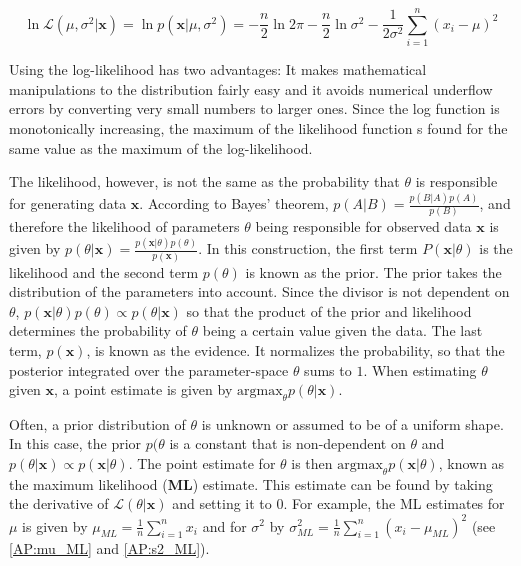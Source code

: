 \begin{equation}\label{eq:logprob}
    \ln \mathcal{L}(\mu, \sigma^2 | \bm{x}) = \ln p(\textbf{x} | \mu, \sigma^2) = -\frac{n}{2} \ln 2 \pi -\frac{n}{2} \ln \sigma ^2 - \frac{1}{2\sigma ^2} \sum_{i=1}^{n} (x_i - \mu)^2
\end{equation}

Using the log-likelihood has two advantages: It makes mathematical manipulations to the distribution fairly easy and it avoids numerical underflow errors by converting very small numbers to larger ones. Since the log function is monotonically increasing, the maximum of the likelihood function s found for the same value as the maximum of the log-likelihood.

 The likelihood, however, is not the same as the probability that $\theta$ is responsible for generating data $\bm{x}$. According to Bayes' theorem, $p(A|B) = \frac{p(B|A) p(A)}{p(B)}$, and therefore the likelihood of parameters $\theta$ being responsible for observed data $\bm{x}$ is given by $p(\theta|\bm{x}) = \frac{p(\bm{x}|\theta) p(\theta)}{p(\bm{x})}$. In this construction, the first term $P(\bm{x}|\theta)$ is the likelihood and the second term $p(\theta)$ is known as the prior. The prior takes the distribution of the parameters into account. Since the divisor is not dependent on $\theta$, $p(\bm{x}|\theta) p(\theta) \propto p(\theta|\bm{x})$ so that the product of the prior and likelihood determines the probability of $\theta$ being a certain value given the data. The last term, $p(\bm{x})$, is known as the evidence. It normalizes the probability, so that the posterior integrated over the parameter-space $\theta$ sums to $1$. When estimating $\theta$ given $\bm{x}$, a point estimate is given by $\text{argmax}_\theta p(\theta|\bm{x})$.
 
 Often, a prior distribution of $\theta$ is unknown or assumed to be of a uniform shape. In this case, the prior $p(\theta$ is a constant that is non-dependent on $\theta$ and $ p(\theta|\bm{x}) \propto p(\bm{x}|\theta)$. The point estimate for $\theta$ is then $\text{argmax}_\theta p(\bm{x}|\theta)$, known as the maximum likelihood (\textbf{ML}) estimate. This estimate can be found by taking the derivative of $\mathcal{L}(\theta|\bm{x})$ and setting it to $0$. For example, the ML estimates for $\mu$ is given by $\mu_{ML} = \frac{1}{n} \sum_{i=1}^{n} x_i$ and for $\sigma^2$ by $\sigma^2_{ML} = \frac{1}{n} \sum_{i=1}^{n} (x_i - \mu_{ML})^2$ (see \ref{AP:mu_ML} and \ref{AP:s2_ML}).\\

